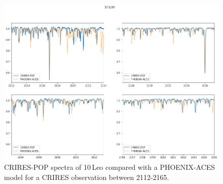 \begin{figure}
    \centering
    \includegraphics[width=0.8\linewidth]{figures/atmos_and_models/CRIRES-POP-mismatch}
    \caption[Comparision of the spectrum of {10\,Leo} to synthetic {PHOENIX-ACES} spectum.]{CRIRES-POP spectra of {10\,Leo} compared with a {PHOENIX-ACES} model for a CRIRES observation between 2112-2165\nm{}.}
    \label{fig:crires-pop-mismatch}
\end{figure}
